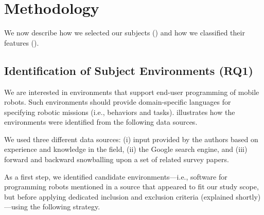 \section{Methodology}
We now describe how we selected our subjects () and how we classified their features ().
 
\subsection{Identification of Subject Environments (RQ1)}
\label{sec:sel}
We are interested in environments that support end-user programming of mobile robots. Such environments should provide domain-specific languages for specifying robotic missions (i.e., behaviors and tasks). %
 illustrates how the environments were identified from the following data sources.

We used three different data sources: (i) input provided by the authors based on experience and knowledge in the field, (ii) the Google search engine, and (iii) forward and backward snowballing upon a set of related survey papers.


As a first step, we identified candidate environments---i.e., software for programming robots mentioned in a source that appeared to fit our study scope, but before applying dedicated inclusion and exclusion criteria (explained shortly)---using the following strategy.

